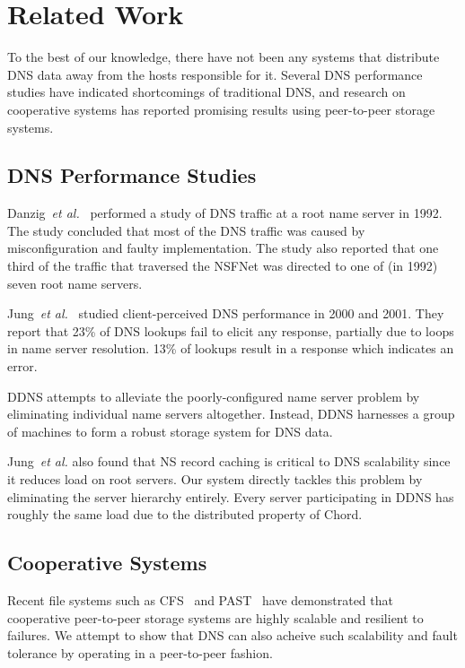 \section{Related Work}

To the best of our knowledge, there have not
been any systems that distribute DNS data away
from the hosts responsible for it.
Several DNS performance
studies have indicated shortcomings 
of traditional DNS, and research on cooperative 
systems has reported promising results using 
peer-to-peer storage systems.
 
\subsection{DNS Performance Studies}

Danzig~{\it et al.}~\cite{dnsroot:sigcomm92} performed 
a study of DNS traffic at a root name server in 
1992. The study concluded that most of the DNS traffic 
was caused by misconfiguration and faulty implementation.
The study also reported that one third of the traffic 
that traversed the NSFNet was directed to one of (in 1992)
seven root name servers. 

Jung~{\it et al.}~\cite{dnscache:sigcommimw01} studied 
client-perceived DNS performance in 2000 and 2001.
They report that 23\% of DNS lookups fail to elicit
any response, partially due to loops in name server resolution.
13\% of lookups result in a response which indicates an error.

DDNS attempts to alleviate the poorly-configured
name server problem by eliminating individual name servers
altogether.  Instead, DDNS harnesses a group of machines
to form a robust storage system for DNS data.

Jung~{\it et al.} also found that NS record caching
is critical to DNS scalability since it reduces load on 
root servers. Our system directly tackles this problem by 
eliminating the server hierarchy entirely.
Every server participating in DDNS has roughly
the same load due to the distributed property of Chord.

\subsection{Cooperative Systems}

Recent file systems such as CFS~\cite{cfs:sosp01} and 
PAST~\cite{past:sosp} have demonstrated that cooperative 
peer-to-peer storage systems 
are highly scalable and resilient to failures. We attempt
to show that DNS can also acheive such scalability 
and fault tolerance by operating in a peer-to-peer fashion.
 


